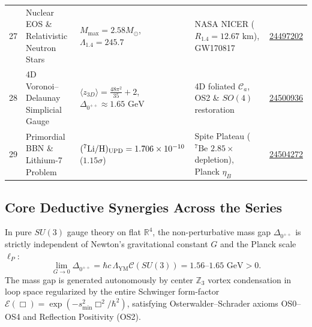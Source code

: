 \documentclass[11pt,a4paper]{article}
\theoremstyle{definition}
\begin{document}
\begin{small}
\begin{longtable}{p{} p{} p{} p{} p{}}
27 & Nuclear EOS \& Relativistic Neutron Stars & $M_{\max} = 2.58 M_\odot$, $\Lambda_{1.4} = 245.7$ & NASA NICER ($R_{1.4} = 12.67\text{ km}$), GW170817 & \href{https://doi.org/10.5281/zenodo.24497202}{24497202} \\
28 & 4D Voronoi--Delaunay Simplicial Gauge & $\langle z_{3D}\rangle = \frac{48\pi^2}{35}+2$, $\Delta_{0^{++}} \approx 1.65\text{ GeV}$ & 4D foliated $\mathcal{C}_a$, OS2 \& $SO(4)$ restoration & \href{https://doi.org/10.5281/zenodo.24500936}{24500936} \\
29 & Primordial BBN \& Lithium-7 Problem & $(^7\text{Li}/\text{H})_{\rm UPD} = 1.706 \times 10^{-10}$ ($1.15\sigma$) & Spite Plateau ($^7\text{Be}$ $2.85\times$ depletion), Planck $\eta_B$ & \href{https://doi.org/10.5281/zenodo.24504272}{24504272} \\
\end{longtable}
\end{small}

\subsection{Core Deductive Synergies Across the Series}

\begin{theorembox}
In pure $SU(3)$ gauge theory on flat $\mathbb{R}^4$, the non-perturbative mass gap $\Delta_{0^{++}}$ is strictly independent of Newton's gravitational constant $G$ and the Planck scale $\ell_P$:
\begin{equation}
\lim_{G \to 0} \Delta_{0^{++}} = \hbar c \, \Lambda_{\mathrm{YM}} \mathcal{C}(SU(3)) = 1.56\text{--}1.65\text{ GeV} > 0.
\end{equation}
The mass gap is generated autonomously by center $\mathbb{Z}_3$ vortex condensation in loop space regularized by the entire Schwinger form-factor $\mathcal{E}(\Box) = \exp(-s_{\mathrm{min}}^2 \Box^2/\hbar^2)$, satisfying Osterwalder--Schrader axioms OS0--OS4 and Reflection Positivity (OS2).
\end{theorembox}
\end{document}
